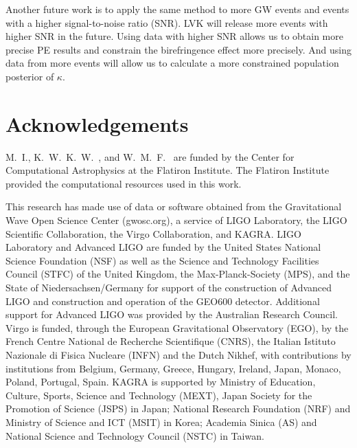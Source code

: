 \documentclass[aps,prd,twocolumn,superscriptaddress,preprintnumbers,floatfix,nofootinbib]{revtex4-2}
\begin{document}
Another future work is to apply the same method to more GW events and events with a higher signal-to-noise ratio (SNR).
LVK will release more events with higher SNR in the future.
Using data with higher SNR allows us to obtain more precise PE results and constrain the birefringence effect more precisely.
And using data from more events will allow us to calculate a more constrained population posterior of $\kappa$.

\section{Acknowledgements}
\label{sec:Acknowledgements}
M.~I., K.~W.~K.~W.~, and W.~M.~F.~ are funded by the Center for Computational Astrophysics at the Flatiron Institute.
The Flatiron Institute provided the computational resources used in this work.

This research has made use of data or software obtained from the Gravitational Wave Open Science Center (gwosc.org), a service of LIGO Laboratory, the LIGO Scientific Collaboration, the Virgo Collaboration, and KAGRA.
LIGO Laboratory and Advanced LIGO are funded by the United States National Science Foundation (NSF) as well as the Science and Technology Facilities Council (STFC) of the United Kingdom, the Max-Planck-Society (MPS), and the State of Niedersachsen/Germany for support of the construction of Advanced LIGO and construction and operation of the GEO600 detector.
Additional support for Advanced LIGO was provided by the Australian Research Council.
Virgo is funded, through the European Gravitational Observatory (EGO), by the French Centre National de Recherche Scientifique (CNRS), the Italian Istituto Nazionale di Fisica Nucleare (INFN) and the Dutch Nikhef, with contributions by institutions from Belgium, Germany, Greece, Hungary, Ireland, Japan, Monaco, Poland, Portugal, Spain.
KAGRA is supported by Ministry of Education, Culture, Sports, Science and Technology (MEXT), Japan Society for the Promotion of Science (JSPS) in Japan; National Research Foundation (NRF) and Ministry of Science and ICT (MSIT) in Korea; Academia Sinica (AS) and National Science and Technology Council (NSTC) in Taiwan.

\pagebreak

\end{document}
